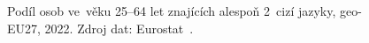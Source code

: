 \def\strProblemyJazykyCelkemTitle{Znalost alespoň 2 cizích jazyků, populace 25--64 let (2022)}%
\def\strProblemyJazykyCelkemColorbarLabel{\% populace 25--64}%
\def\strProblemyJazykyCelkemCaption{Podíl osob ve~věku 25--64 let znajících alespoň 2~cizí jazyky, \acs{geo-EU27}, 2022. Zdroj dat: Eurostat~\cite{eurostat_edat_aes}.}%
%
\begin{figure}[htbp]
  \centering
  \resizebox{\linewidth}{!}{}
  \caption{\strProblemyJazykyCelkemCaption}
  \label{fig:problemy_jazyky_celkem}
\end{figure}
